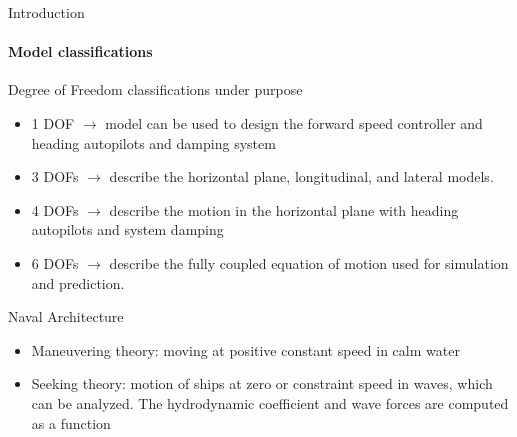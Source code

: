 \begin{frame}{Introduction}
	\framesubtitle{Model classifications}
	Degree of Freedom classifications under purpose
	\begin{itemize}
		\item 1 DOF $\to$ model can be used to design the forward speed controller and heading autopilots and damping system
		\item 3 DOFs $\to$ describe the horizontal plane, longitudinal, and lateral models.
		\item 4 DOFs $\to$ describe the motion in the horizontal plane with heading autopilots and system damping
		\item 6 DOFs $\to$ describe the fully coupled equation of motion used for simulation and prediction.
	\end{itemize}
	
	Naval Architecture
	\begin{itemize}
		\item Maneuvering theory: moving at positive constant speed in calm water
		\item  Seeking theory: motion of ships at zero or constraint speed in waves, which can be analyzed. The hydrodynamic coefficient and wave forces are computed as a function
	\end{itemize}
\end{frame}


